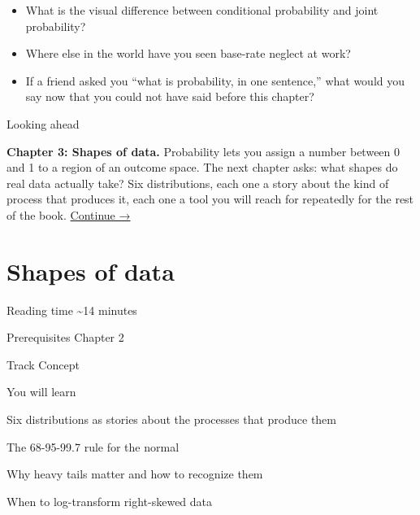 \documentclass[
  letterpaper,
  11pt,
  twoside,
  openany]{scrbook}
\providecommand{\tightlist}{%
  \setlength{\itemsep}{0pt}\setlength{\parskip}{0pt}}
\begin{document}
\begin{tcolorbox}[enhanced jigsaw, arc=.35mm, bottomrule=.15mm, bottomtitle=1mm, breakable, colback=white, colbacktitle=quarto-callout-caution-color!10!white, colframe=quarto-callout-caution-color-frame, coltitle=black, left=2mm, leftrule=.75mm, opacityback=0, opacitybacktitle=0.6, rightrule=.15mm, title=\textcolor{quarto-callout-caution-color}{\faFire}\hspace{0.5em}{Reflect before moving on}, titlerule=0mm, toprule=.15mm, toptitle=1mm]

\begin{itemize}
\tightlist
\item
  What is the visual difference between conditional probability and
  joint probability?
\item
  Where else in the world have you seen base-rate neglect at work?
\item
  If a friend asked you ``what is probability, in one sentence,'' what
  would you say now that you could not have said before this chapter?
\end{itemize}

\end{tcolorbox}

{Looking ahead}

\textbf{Chapter 3: Shapes of data.} Probability lets you assign a number
between 0 and 1 to a region of an outcome space. The next chapter asks:
what shapes do real data actually take? Six distributions, each one a
story about the kind of process that produces it, each one a tool you
will reach for repeatedly for the rest of the book.
\href{03-shapes-of-data.qmd}{Continue →}

\chapter{Shapes of data}\label{shapes-of-data}

{Reading time} {\textasciitilde14 minutes}

{Prerequisites} {Chapter 2}

{Track} {Concept}

{You will learn}

Six distributions as stories about the processes that produce them

The 68-95-99.7 rule for the normal

Why heavy tails matter and how to recognize them

When to log-transform right-skewed data
\end{document}
